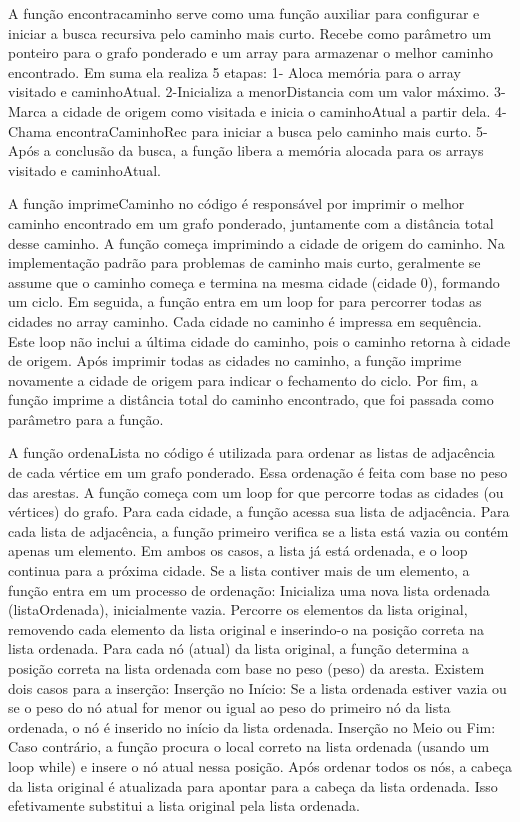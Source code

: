 \documentclass{article}
\begin{document}
A função encontracaminho serve como uma função auxiliar para configurar e iniciar a busca recursiva pelo caminho mais curto. Recebe como parâmetro um ponteiro para o grafo ponderado e um array para armazenar o melhor caminho encontrado. Em suma ela realiza 5 etapas: 1- Aloca memória para o array visitado e caminhoAtual. 
2-Inicializa a menorDistancia com um valor máximo. 
3-Marca a cidade de origem como visitada e inicia o caminhoAtual a partir dela.
4-Chama encontraCaminhoRec para iniciar a busca pelo caminho mais curto.
5-Após a conclusão da busca, a função libera a memória alocada para os arrays visitado e caminhoAtual.

A função imprimeCaminho no código é responsável por imprimir o melhor caminho encontrado em um grafo ponderado, juntamente com a distância total desse caminho. A função começa imprimindo a cidade de origem do caminho. Na implementação padrão para problemas de caminho mais curto, geralmente se assume que o caminho começa e termina na mesma cidade (cidade 0), formando um ciclo. Em seguida, a função entra em um loop for para percorrer todas as cidades no array caminho. Cada cidade no caminho é impressa em sequência. Este loop não inclui a última cidade do caminho, pois o caminho retorna à cidade de origem. Após imprimir todas as cidades no caminho, a função imprime novamente a cidade de origem para indicar o fechamento do ciclo. Por fim, a função imprime a distância total do caminho encontrado, que foi passada como parâmetro para a função.


A função ordenaLista no código é utilizada para ordenar as listas de adjacência de cada vértice em um grafo ponderado. Essa ordenação é feita com base no peso das arestas. A função começa com um loop for que percorre todas as cidades (ou vértices) do grafo. Para cada cidade, a função acessa sua lista de adjacência. Para cada lista de adjacência, a função primeiro verifica se a lista está vazia ou contém apenas um elemento. Em ambos os casos, a lista já está ordenada, e o loop continua para a próxima cidade. Se a lista contiver mais de um elemento, a função entra em um processo de ordenação:
Inicializa uma nova lista ordenada (listaOrdenada), inicialmente vazia.
Percorre os elementos da lista original, removendo cada elemento da lista original e inserindo-o na posição correta na lista ordenada. Para cada nó (atual) da lista original, a função determina a posição correta na lista ordenada com base no peso (peso) da aresta.
Existem dois casos para a inserção:
Inserção no Início: Se a lista ordenada estiver vazia ou se o peso do nó atual for menor ou igual ao peso do primeiro nó da lista ordenada, o nó é inserido no início da lista ordenada.
Inserção no Meio ou Fim: Caso contrário, a função procura o local correto na lista ordenada (usando um loop while) e insere o nó atual nessa posição. Após ordenar todos os nós, a cabeça da lista original é atualizada para apontar para a cabeça da lista ordenada. Isso efetivamente substitui a lista original pela lista ordenada.
\end{document}
